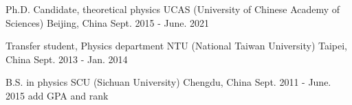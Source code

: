 

\begin{cventries}

    \cventry
        {Ph.D. Candidate, theoretical physics} %
        {UCAS (University of Chinese Academy of Sciences)} %
        {Beijing, China} %
        {Sept. 2015 - June. 2021} %
        {}

    \cventry
        {Transfer student, Physics department}
        {NTU (National Taiwan University)}
        {Taipei, China}
        {Sept. 2013 - Jan. 2014}
        {}

    \cventry
        {B.S. in physics}
        {SCU (Sichuan University)}
        {Chengdu, China}
        {Sept. 2011 - June. 2015}
        {add GPA and rank}

\end{cventries}

